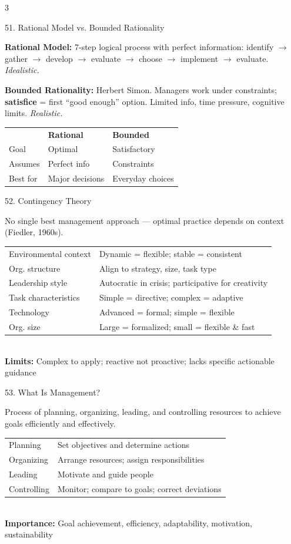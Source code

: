 \documentclass[7.5pt, letterpaper]{article}
\newcommand{\concept}[1]{%
  \vspace{2.5pt}%
  \noindent\colorbox{accent}{\parbox{\dimexpr\linewidth-2\fboxsep}{\fontsize{6.8pt}{7.5pt}\selectfont\bfseries\color{white}\strut #1\strut}}%
  \vspace{1pt}\par%
}
\newcommand{\kv}[2]{\noindent\textbf{#1:} #2\par}
\newcommand{\minitab}[1]{%
  \begingroup
  \fontsize{6.2pt}{7pt}\selectfont
  \setlength{\tabcolsep}{2pt}
  #1
  \endgroup
}
\begin{document}
\begin{multicols}{3}
\concept{51. Rational Model vs. Bounded Rationality}
\kv{Rational Model}{7-step logical process with perfect information: identify $\to$ gather $\to$ develop $\to$ evaluate $\to$ choose $\to$ implement $\to$ evaluate. \textit{Idealistic.}}
\kv{Bounded Rationality}{Herbert Simon. Managers work under constraints; \textbf{satisfice} = first ``good enough'' option. Limited info, time pressure, cognitive limits. \textit{Realistic.}}
\minitab{\begin{tabular}{@{}lll@{}}
 & \textbf{Rational} & \textbf{Bounded}\\
Goal & Optimal & Satisfactory\\
Assumes & Perfect info & Constraints\\
Best for & Major decisions & Everyday choices\\
\end{tabular}}

\concept{52. Contingency Theory}
No single best management approach --- optimal practice depends on context (Fiedler, 1960s).\\
\minitab{\begin{tabular}{@{}ll@{}}
Environmental context & Dynamic = flexible; stable = consistent\\
Org. structure & Align to strategy, size, task type\\
Leadership style & Autocratic in crisis; participative for creativity\\
Task characteristics & Simple = directive; complex = adaptive\\
Technology & Advanced = formal; simple = flexible\\
Org. size & Large = formalized; small = flexible \& fast\\
\end{tabular}}\\
\kv{Limits}{Complex to apply; reactive not proactive; lacks specific actionable guidance}

\concept{53. What Is Management?}
Process of planning, organizing, leading, and controlling resources to achieve goals efficiently and effectively.\\
\minitab{\begin{tabular}{@{}ll@{}}
Planning & Set objectives and determine actions\\
Organizing & Arrange resources; assign responsibilities\\
Leading & Motivate and guide people\\
Controlling & Monitor; compare to goals; correct deviations\\
\end{tabular}}\\
\kv{Importance}{Goal achievement, efficiency, adaptability, motivation, sustainability}


\end{multicols}
\end{document}
